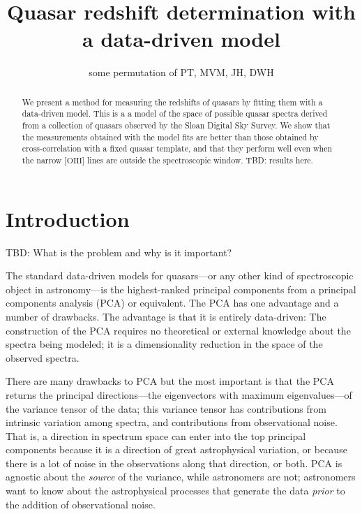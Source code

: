 \documentclass[apj]{emulateapj}
\newcounter{address}
\newcommand{\forbidden}[1]{{[}{\mathrm{#1}}{]}}
\newcommand{\OIII}{\forbidden{OIII}}
\begin{document}
\title{Quasar redshift determination with a data-driven model}
\author{some permutation of PT\altaffilmark{\ref{MPIA}},
        MVM\altaffilmark{\ref{MPIA},\ref{Caltech}},
        JH\altaffilmark{\ref{MPIA},\ref{email}},
        DWH\altaffilmark{\ref{MPIA},\ref{CCPP}}}
\setcounter{address}{1}

\begin{abstract}
We present a method for measuring the redshifts of quasars by fitting
them with a data-driven model.  This is a a model of the space of
possible quasar spectra derived from a collection of quasars observed
by the Sloan Digital Sky Survey.  We show that the measurements
obtained with the model fits are better than those obtained by
cross-correlation with a fixed quasar template, and that they perform
well even when the narrow $\OIII$ lines are outside the spectroscopic
window.  TBD: results here.
\end{abstract}

\section{Introduction}

TBD: What is the problem and why is it important?

The standard data-driven models for quasars---or any other kind of
spectroscopic object in astronomy---is the highest-ranked principal
components from a principal components analysis (PCA) or equivalent.
The PCA has one advantage and a number of drawbacks.  The advantage is
that it is entirely data-driven: The construction of the PCA requires
no theoretical or external knowledge about the spectra being modeled;
it is a dimensionality reduction in the space of the observed spectra.

There are many drawbacks to PCA but the most important is that the PCA
returns the principal directions---the eigenvectors with maximum
eigenvalues---of the variance tensor of the data; this variance tensor
has contributions from intrinsic variation among spectra, and
contributions from observational noise.  That is, a direction in
spectrum space can enter into the top principal components because it
is a direction of great astrophysical variation, or because there is a
lot of noise in the observations along that direction, or both.  PCA
is agnostic about the \emph{source} of the variance, while astronomers
are not; astronomers want to know about the astrophysical processes
that generate the data \emph{prior} to the addition of observational
noise.
\end{document}
